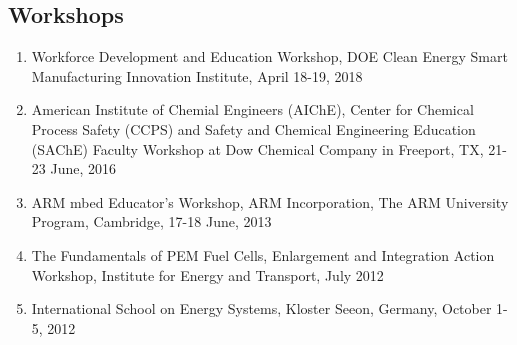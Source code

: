 \documentclass[10pt]{article}
\begin{document}
\subsection{Workshops}
\begin{enumerate}[nosep]
\item Workforce Development and Education Workshop, DOE Clean Energy Smart Manufacturing Innovation Institute, April 18-19, 2018

\item American Institute of Chemial Engineers (AIChE), Center for Chemical Process Safety (CCPS) and Safety and Chemical Engineering Education (SAChE) Faculty Workshop at Dow Chemical Company in Freeport, TX, 21-23 June, 2016

\item ARM mbed Educator’s Workshop, ARM Incorporation, The ARM University Program, Cambridge, 17-18 June, 2013

\item The Fundamentals of PEM Fuel Cells, Enlargement and Integration Action Workshop, Institute for Energy and Transport, July 2012

\item International School on Energy Systems, Kloster Seeon, Germany, October 1-5, 2012
\end{enumerate}
\end{document}
